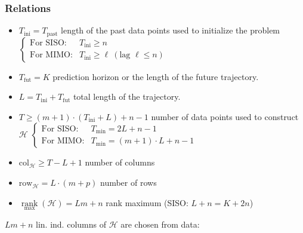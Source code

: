 \subsubsection{Relations}
\begin{itemize}
    \item $\boxed{T_\mathrm{ini} = T_\mathrm{past}}$ length of the past data points used to initialize the problem $\begin{cases}
            \text{For SISO:} & T_\mathrm{ini} \geq n \\
            \text{For MIMO:} & T_\mathrm{ini} \geq \ell \ (\text{lag } \ell \leq n)
        \end{cases}$
    \item $\boxed{T_\mathrm{fut} = K}$ prediction horizon or the length of the future trajectory.
    \item $\boxed{L = T_\mathrm{ini} + T_\mathrm{fut}}$ 
    total length of the trajectory.
    \item $\boxed{T \geq (m + 1) \cdot (T_\mathrm{ini} + L) + n - 1}$ number of data points used to construct $\mathcal{H}$ $\begin{cases}
            \text{For SISO:} & T_\mathrm{min} = 2L + n - 1 \\
            \text{For MIMO:} & T_\mathrm{min} = (m+1) \cdot L + n - 1
        \end{cases}$
    \item $\boxed{\text{col}_\mathcal{H} \geq T - L + 1}$ number of columns
    \item $\boxed{\text{row}_\mathcal{H} = L \cdot (m + p)}$ number of rows
    \item $\boxed{\underset{\text{max}}{\operatorname{rank}}(\mathcal{H}) = Lm + n}$ rank maximum (SISO: $L+n = K+2n$)
\end{itemize}
\textbullet \; $Lm + n$ lin. ind. columns of $\mathcal{H}$ are chosen from data:

